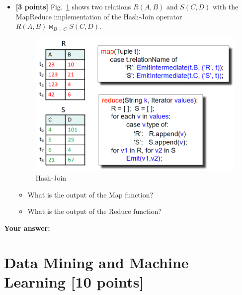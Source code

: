 \documentclass[10pt]{article}
\begin{document}
\begin{enumerate}
\begin{itemize}
\begin{itemize}
		            \end{itemize}
		      \item[(c)] \textbf{[3 points]}  Fig.~\ref{mr3} shows two relations $R(A,B)$ and $S(C,D)$ with the MapReduce implementation of the Hash-Join operator $R(A,B) \bowtie_{B=C} S(C,D)$.
		            \begin{figure}[H]
			            \centering
			            \includegraphics[width=0.55\linewidth]{mr_join}
			            \caption{Hash-Join}
			            \label{mr3}
		            \end{figure}
		            \begin{itemize}
			            \item[(1)] What is the output of the Map function?
			            \item[(2)] What is the output of the Reduce function? \\
		            \end{itemize}
	      \end{itemize}

\end{enumerate}
\textbf{Your answer:}


\newpage
\section{Data Mining and Machine Learning \textbf{[10 points]}}
\end{document}
